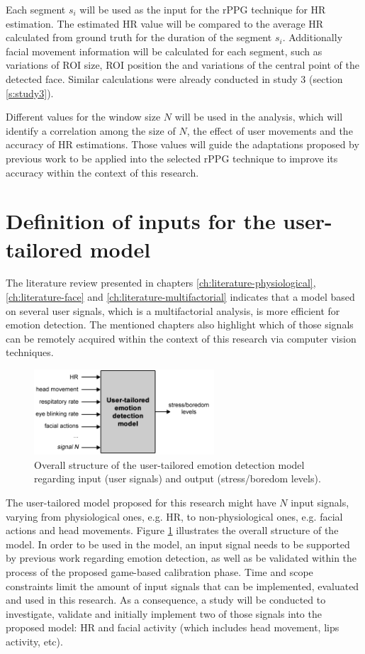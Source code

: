 Each segment $s_i$ will be used as the input for the rPPG technique for HR estimation. The estimated HR value will be compared to the average HR calculated from ground truth for the duration of the segment $s_i$. Additionally facial movement information will be calculated for each segment, such as variations of ROI size, ROI position the and variations of the central point of the detected face. Similar calculations were already conducted in study 3 (section \ref{s:study3}).

Different values for the window size $N$ will be used in the analysis, which will identify a correlation among the size of $N$, the effect of user movements and the accuracy of HR estimations. Those values will guide the adaptations proposed by previous work \parencite{li2014remote} to be applied into the selected rPPG technique to improve its accuracy within the context of this research.

\section{Definition of inputs for the user-tailored model}
\label{sec:closing-definition-inputs}

The literature review presented in chapters \ref{ch:literature-physiological}, \ref{ch:literature-face} and \ref{ch:literature-multifactorial} indicates that a model based on several user signals, which is a multifactorial analysis, is more efficient for emotion detection. The mentioned chapters also highlight which of those signals can be remotely acquired within the context of this research via computer vision techniques.

\begin{figure}[h]
    \centering
    \includegraphics[width=0.6\textwidth]{figures/model-inputs-set.png}
    \caption{Overall structure of the user-tailored emotion detection model regarding input (user signals) and output (stress/boredom levels).}
    \label{fig:model-inputs-set}
\end{figure}

The user-tailored model proposed for this research might have $N$ input signals, varying from physiological ones, e.g. HR, to non-physiological ones, e.g. facial actions and head movements. Figure \ref{fig:model-inputs-set} illustrates the overall structure of the model. In order to be used in the model, an input signal needs to be supported by previous work regarding emotion detection, as well as be validated within the process of the proposed game-based calibration phase. Time and scope constraints limit the amount of input signals that can be implemented, evaluated and used in this research. As a consequence, a study will be conducted to investigate, validate and initially implement two of those signals into the proposed model: HR and facial activity (which includes head movement, lips activity, etc).

